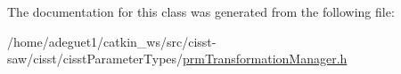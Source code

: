The documentation for this class was generated from the following file\-:\begin{DoxyCompactItemize}
\item 
/home/adeguet1/catkin\-\_\-ws/src/cisst-\/saw/cisst/cisst\-Parameter\-Types/\hyperlink{prm_transformation_manager_8h}{prm\-Transformation\-Manager.\-h}\end{DoxyCompactItemize}
